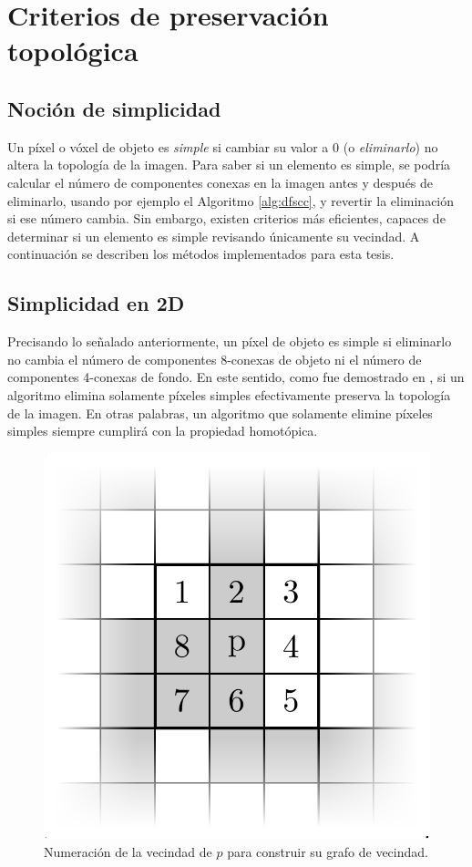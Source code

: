 \section{Criterios de preservación topológica}

\subsection{Noción de simplicidad}

Un píxel o vóxel de objeto es \textit{simple} si cambiar su valor a 0 (o \textit{eliminarlo}) no altera la topología de la imagen. Para saber si un elemento es simple, se podría calcular el número de componentes conexas en la imagen antes y después de eliminarlo, usando por ejemplo el Algoritmo \ref{alg:dfscc}, y revertir la eliminación si ese número cambia. Sin embargo, existen criterios más eficientes, capaces de determinar si un elemento es simple revisando únicamente su vecindad. A continuación se describen los métodos implementados para esta tesis.

\subsection{Simplicidad en 2D}

Precisando lo señalado anteriormente, un píxel de objeto es simple si eliminarlo no cambia el número de componentes 8-conexas de objeto ni el número de componentes 4-conexas de fondo. En este sentido, como fue demostrado en \cite{stefanelli1971some}, si un algoritmo elimina solamente píxeles simples efectivamente preserva la topología de la imagen. En otras palabras, un algoritmo que solamente elimine píxeles simples siempre cumplirá con la propiedad homotópica. 

\begin{figure}[ht]\centering
\includegraphics[width=0.35\linewidth]{images/2dsimpletestimageextract}
\caption{Numeración de la vecindad de $p$ para construir su grafo de vecindad.}
\label{fig:2dsimplen8}
\end{figure}

